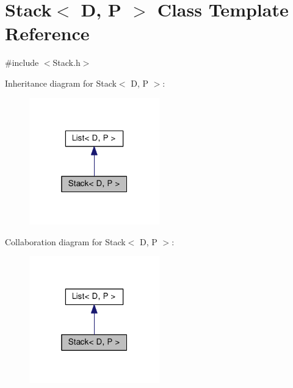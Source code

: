 \hypertarget{classStack}{}\section{Stack$<$ D, P $>$ Class Template Reference}
\label{classStack}


{\ttfamily \#include $<$Stack.\+h$>$}



Inheritance diagram for Stack$<$ D, P $>$\+:
\nopagebreak
\begin{figure}[H]
\begin{center}
\leavevmode
\includegraphics[width=160pt]{classStack__inherit__graph}
\end{center}
\end{figure}


Collaboration diagram for Stack$<$ D, P $>$\+:
\nopagebreak
\begin{figure}[H]
\begin{center}
\leavevmode
\includegraphics[width=160pt]{classStack__coll__graph}
\end{center}
\end{figure}
